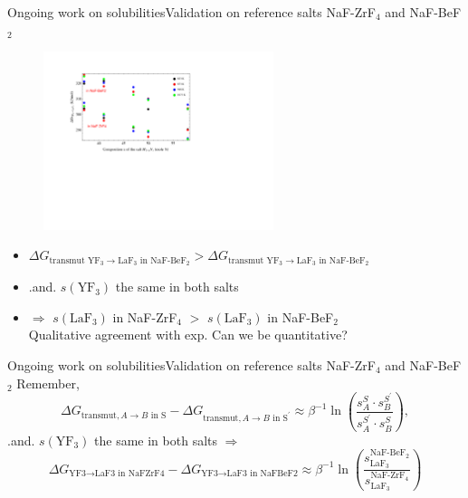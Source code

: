\documentclass{beamer}
\begin{document}
\begin{frame}{Ongoing work on solubilities}{Validation on reference salts NaF-ZrF$_4$ and NaF-BeF$_2$}
    \begin{figure}
        \includegraphics[width=0.6\textwidth]{dGtransZrBe}
    \end{figure}
    \begin{itemize}
        \item $\Delta G_{\text{transmut YF}_3 \rightarrow \text{LaF}_3\text{ in NaF-BeF}_2} > \Delta G_{\text{transmut YF}_3 \rightarrow \text{LaF}_3\text{ in NaF-BeF}_2}$
        \item .and. $s(\text{YF}_3)$ the same in both salts
        \item $\Rightarrow$ $s(\text{LaF}_3)$ in NaF-ZrF$_4$ $>$ $s(\text{LaF}_3)$ in NaF-BeF$_2$ \\ Qualitative agreement with exp. Can we be quantitative?
    \end{itemize}
\end{frame}
\begin{frame}{Ongoing work on solubilities}{Validation on reference salts NaF-ZrF$_4$ and NaF-BeF$_2$}
    Remember,
    \begin{equation}
        \Delta G_{\text{transmut},A\rightarrow B\text{ in S}} - \Delta G_{\text{transmut},A\rightarrow B\text{ in S}^{\prime}} \approx \beta^{-1}\ln\left(\frac{s_A^S\cdot s_B^{S^\prime}}{s_A^{S^{\prime}}\cdot s_B^S}\right),   \nonumber
    \end{equation}
    .and. $s(\text{YF}_3)$ the same in both salts $\Rightarrow $
    \begin{equation}
        \Delta G_{\text{YF3}\rightarrow\text{LaF3 in NaFZrF4}} - \Delta G_{\text{YF3}\rightarrow\text{LaF3 in NaFBeF2}} \approx \beta^{-1}\ln\left(\frac{s_{\text{LaF}_3}^{\text{NaF-BeF}_2}}{s_{\text{LaF}_3}^{\text{NaF-ZrF}_4}}\right) \nonumber
    \end{equation}
\end{frame}
\end{document}

